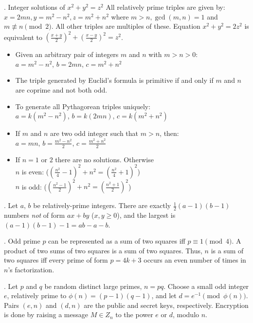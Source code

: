 .  Integer solutions of $x^2 + y^2 = z^2$
All relatively prime triples are given by:
$x=2mn, y=m^2-n^2, z=m^2+n^2$ where $m>n, \gcd(m,n)=1$ and $m \not\equiv n \pmod{2}$.
All other triples are multiples of these.
Equation $x^2 + y^2 = 2z^2$ is equivalent to $(\frac{x+y}{2})^2 + (\frac{x-y}{2})^2 = z^2$.
\begin{itemize}
\item Given an arbitrary pair of integers $m$ and $n$ with $m > n > 0$:\\
$a = m^2 - n^2$, $b = 2mn$, $c = m^2 + n^2$
\item The triple generated by Euclid's formula is primitive if and only if $m$ and $n$ are coprime and not both odd.
\item To generate all Pythagorean triples uniquely:\\
$a = k (m^2 - n^2)$, $b = k(2mn)$, $c = k(m^2 + n^2)$
\item If $m$ and $n$ are two odd integer such that $m > n$, then:\\
$a = mn$, $b = \frac{m^2 - n^2}{2}$, $c = \frac{m^2 + n^2}{2}$
\item If $n=1$ or $2$ there are no solutions. Otherwise\\
$n$ is even: ($(\frac{n^2}{4} - 1)^2 + n^2 = (\frac{n^2}{4} + 1)^2$)\\
$n$ is odd: ($(\frac{n^2 - 1}{2})^2 + n^2 = (\frac{n^2 + 1}{2})^2$)
\end{itemize}


.  Let $a$, $b$ be relatively-prime integers.
There are exactly $\frac{1}{2}(a-1)(b-1)$ numbers \emph{not} of form $ax+by$ ($x,y \ge 0$),
and the largest is $(a-1)(b-1)-1 = ab - a - b$.

.  Odd prime $p$ can be represented
as a sum of two squares iff $p \equiv 1 {\pmod 4}$.
A product of two sums of two squares is a sum of two squares.
Thus, $n$ is a sum of two squares iff every prime of
form $p=4k+3$ occurs an even number of times in $n$'s factorization.

. Let $p$ and $q$ be random distinct large primes, $n = pq$.
Choose a small odd integer $e$, relatively prime to $\phi(n) = (p-1)(q-1)$,
and let $d = e^{-1} \pmod{\phi(n)}$. Pairs $(e,n)$ and $(d,n)$ are
the public and secret keys, respectively.
Encryption is done by raising a message $M \in Z_n$ to the power $e$ or $d$,
modulo $n$.